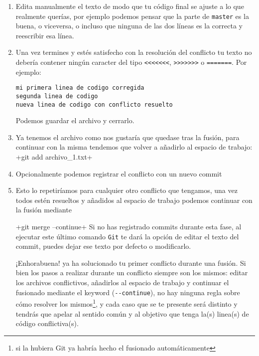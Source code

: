 \documentclass[a5paper,10pt]{article}
\begin{document}
\begin{enumerate}
    \item Edita manualmente el texto de modo que tu código final se ajuste a lo que realmente querías, por ejemplo podemos pensar que la parte de \verb+master+ es la buena, o viceversa, o incluso que ninguna de las dos líneas es la correcta y reescribir esa línea.
    
    \item Una vez termines y estés satisfecho con la resolución del conflicto tu texto no debería contener ningún caracter del tipo \verb+<<<<<<<+, \verb+>>>>>>>+ o \verb+=======+. Por ejemplo:
  
    \begin{lstlisting}[style=custom]
mi primera linea de codigo corregida
segunda linea de codigo
nueva linea de codigo con conflicto resuelto
    \end{lstlisting}
    
    Podemos guardar el archivo y cerrarlo.
    
    \item Ya tenemos el archivo como nos gustaría que quedase tras la fusión, para continuar con la misma tendemos que volver a añadirlo al espacio de trabajo:
    \cverb+git add archivo_1.txt+
    
    \item Opcionalmente podemos registrar el conflicto con un nuevo commit
    
    \item Esto lo repetiríamos para cualquier otro conflicto que tengamos, una vez todos estén resueltos y añadidos al espacio de trabajo podemos continuar con la fusión mediante
    
    \cverb+git merge --continue+
    Si no has registrado commits durante esta fase, al ejecutar este último comando \verb+Git+ te dará la opción de editar el texto del commit, puedes dejar ese texto por defecto o modificarlo.
    
    ¡Enhorabuena! ya ha solucionado tu primer conflicto durante una fusión. Si bien los pasos a realizar durante un conflicto siempre son los mismos: editar los archivos conflictivos, añadirlos al espacio de trabajo y continuar el fusionado mediante el keyword (\verb+--continue+), no hay ninguna regla sobre cómo resolver los mismos\footnote{si la hubiera Git ya habría hecho el fusionado automáticamente}, y cada caso que se te presente será distinto y tendrás que apelar al sentido común y al objetivo que tenga la(s) linea(s) de código conflictiva(s).
     
    \end{enumerate}
\end{document}
